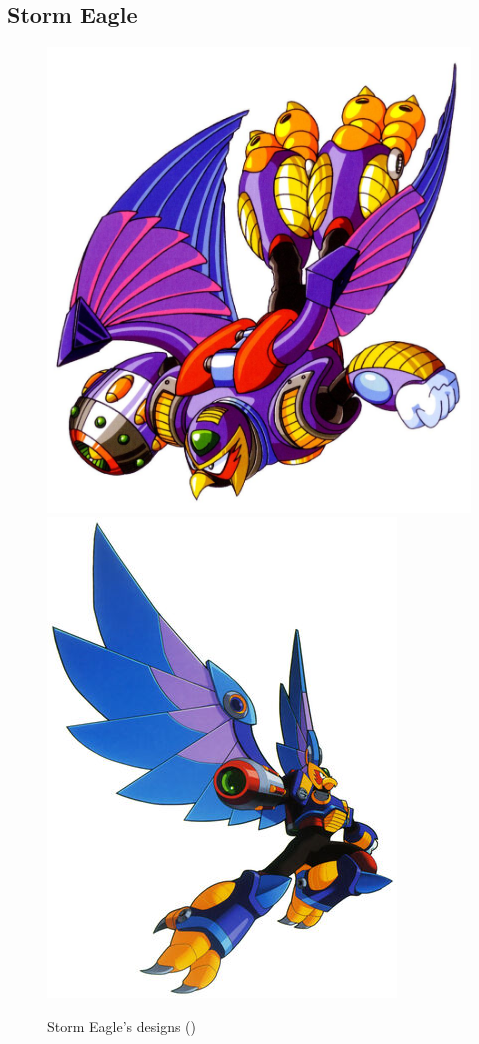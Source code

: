 \subsection{Storm Eagle}\label{boss:Storm_Eagle}
\begin{figure}[htp]
	\centering
	\includegraphics[height=\portraitsize]{figures/X1/Storm_eagle/Storm_Eagle.jpg}
	\includegraphics[height=\portraitsize]{figures/X1/Storm_eagle/MHXStormEagle.jpg}
	\caption{Storm Eagle's designs (\cite{book:MMX_Complete_art})}
\end{figure}

